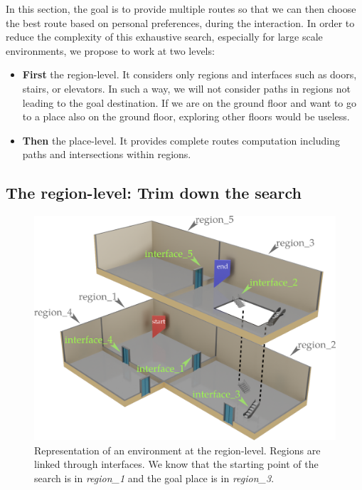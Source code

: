 In this section, the goal is to provide multiple routes so that we can then choose the best route based on personal preferences, during the interaction. In order to reduce the complexity of this exhaustive search, especially for large scale environments, we propose to work at two levels:
\begin{itemize}
\item \textbf{First} the region-level. It considers only regions and interfaces such as doors, stairs, or elevators. In such a way, we will not consider paths in regions not leading to the goal destination. If we are on the ground floor and want to go to a place also on the ground floor, exploring other floors would be useless.
\item \textbf{Then} the place-level. It provides complete routes computation including paths and intersections within regions.
\end{itemize}

\subsection{The region-level: Trim down the search}

\begin{figure}[b!]
\centering
\includegraphics[scale=0.22]{figures/chapter3/building_regions.png}
\caption{\label{fig:chap3_regions} Representation of an environment at the region-level. Regions are linked through interfaces. We know that the starting point of the search is in \textit{region\_1} and the goal place is in \textit{region\_3}. }
\end{figure}

